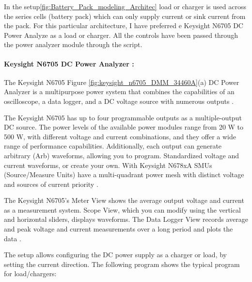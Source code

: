 In the setup\ref{fig:Battery_Pack_modeling_Architec} load or charger is used across the series cells (battery pack) which can only supply current or sink current from the pack. For this particular architecture, I have preferred e Keysight N6705 DC Power Analyze as a load or charger. All the controls have been passed through the power analyzer module through the script.

\paragraph{ Keysight N6705 DC Power Analyzer :}

The Keysight N6705 Figure \ref{fig:keysight_n6705_DMM_34460A}(a) DC Power Analyzer is a multipurpose power system that combines the capabilities of an oscilloscope, a data logger, and a DC voltage source with numerous outputs \cite{Keysight_N6705_DC_Power_Analyzer}.

The Keysight N6705 has up to four programmable outputs as a multiple-output DC source. The power levels of the available power modules range from 20 W to 500 W, with different voltage and current combinations, and they offer a wide range of performance capabilities. Additionally, each output can generate arbitrary (Arb) waveforms, allowing you to program. Standardized voltage and current waveforms, or create your own. With Keysight N678xA SMUs (Source/Measure Units) have a multi-quadrant power mesh with distinct voltage and sources of current priority \cite{Keysight_N6705_DC_Power_Analyzer}.


The Keysight N6705's Meter View shows the average output voltage and current as a measurement system. Scope View, which you can modify using the vertical and horizontal sliders, displays waveforms. The Data Logger View records average and peak voltage and current measurements over a long period and plots the data \cite{Keysight_N6705_DC_Power_Analyzer}.

The setup allows configuring the DC power supply as a charger or load, by setting the current direction.  The following program shows the typical program for load/chargers:

